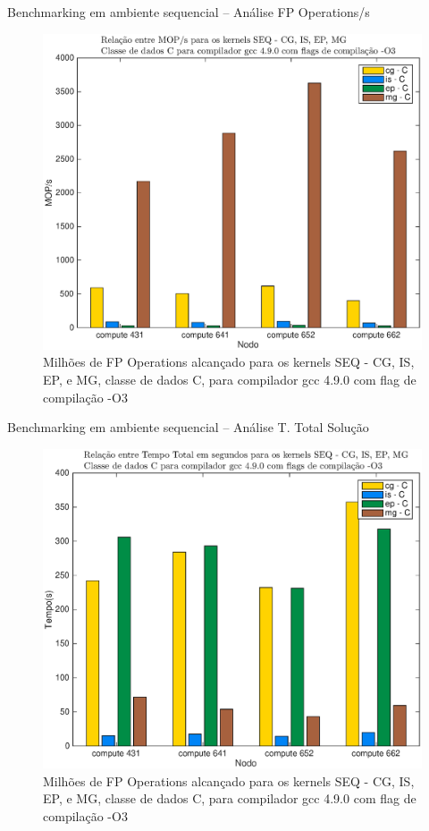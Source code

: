 \documentclass{beamer}
\begin{document}
   \begin{frame}{Benchmarking em ambiente sequencial -- {\small Análise FP Operations/s}}

\begin{figure}[H]
\centering
\includegraphics[width=0.75\columnwidth]{EPS/PRESENTATION_SPECIAL/mops_seq.eps}

\caption{\tiny Milhões de FP Operations alcançado para os kernels SEQ - CG, IS, EP, e MG, classe de dados C, para  compilador gcc 4.9.0 com flag de compilação -O3}
\label{mops_seq}
\end{figure}
  \end{frame}


   \begin{frame}{Benchmarking em ambiente sequencial -- {\small Análise T. Total Solução}}

\begin{figure}[H]
\centering
\includegraphics[width=0.75\columnwidth]{EPS/SEQ/TEMPO_seq_gcc_C_all.eps}

\caption{\tiny Milhões de FP Operations alcançado para os kernels SEQ - CG, IS, EP, e MG, classe de dados C, para  compilador gcc 4.9.0 com flag de compilação -O3}
\label{time_seq}
\end{figure}
\end{frame}
\end{document}
